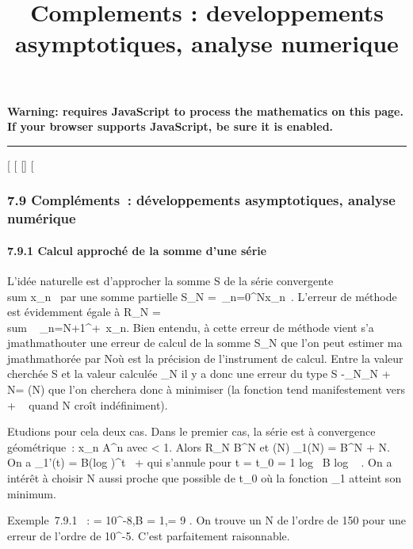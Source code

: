 \documentclass[]{article}
\title{Complements : developpements asymptotiques, analyse numerique}
\author{}
\date{}
\begin{document}
\maketitle

\textbf{Warning: 
requires JavaScript to process the mathematics on this page.\\ If your
browser supports JavaScript, be sure it is enabled.}

\begin{center}\rule{3in}{0.4pt}\end{center}

{[}
{[}
{[}{]}
{[}

\subsubsection{7.9 Compléments~: développements asymptotiques, analyse
numérique}

\paragraph{7.9.1 Calcul approché de la somme d'une série}

L'idée naturelle est d'approcher la somme S de la série convergente
\\sum  x_n~ par
une somme partielle S_N =\
\sum  _n=0^Nx_n~.
L'erreur de méthode est évidemment égale à R_N
= \\sum ~
_n=N+1^+\infty~x_n. Bien entendu, à cette erreur de
méthode vient s'a\\jmathmathouter une erreur de calcul de la somme S_N
que l'on peut estimer ma\\jmathmathorée par N\epsilon où \epsilon est la précision de
l'instrument de calcul. Entre la valeur cherchée S et la valeur calculée
\overlineS_N il y a donc une erreur du type
S
-\overlineS_N\leqR_N
+ N\epsilon = \delta(N) que l'on cherchera donc à minimiser (la fonction \delta tend
manifestement vers + \infty~ quand N croît indéfiniment).

Etudions pour cela deux cas. Dans le premier cas, la série est à
convergence géométrique~: x_n\leq
A\rho^n avec \rho \textless{} 1. Alors R_N \leq
B\rho^N et \delta(N) \leq \delta_1(N) = B\rho^N + N\epsilon. On a
\delta_1'(t) = B(log \rho)\rho^t~ + \epsilon
qui s'annule pour t = t_0 = 1 \over \rho
 log~ \left  \epsilon
\over B log \rho~
\right . On a intérêt à choisir N aussi proche
que possible de t_0 où la fonction \delta_1 atteint son
minimum.

Exemple~7.9.1 ~: \epsilon = 10^-8,B = 1,\rho = 9  . On trouve un N de l'ordre de 150 pour une erreur de l'ordre de
10^-5. C'est parfaitement raisonnable.
\end{document}
